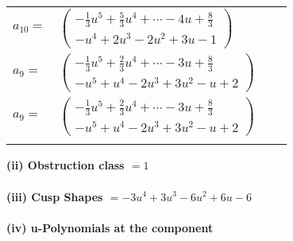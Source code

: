 \documentclass[1p]{elsarticle_modified}
\theoremstyle{definition}
\begin{document}
\begin{tabular}{m{7pt} m{180pt} m{7pt} m{180pt} }
\flushright $a_{10}=$&$\begin{pmatrix}-\frac{1}{3} u^5+\frac{5}{3} u^4+\cdots-4 u+\frac{8}{3}\\- u^4+2 u^3-2 u^2+3 u-1\end{pmatrix}$ \\
\flushright $a_{9}=$&$\begin{pmatrix}-\frac{1}{3} u^5+\frac{2}{3} u^4+\cdots-3 u+\frac{8}{3}\\- u^5+u^4-2 u^3+3 u^2- u+2\end{pmatrix}$\\ \flushright $a_{9}=$&$\begin{pmatrix}-\frac{1}{3} u^5+\frac{2}{3} u^4+\cdots-3 u+\frac{8}{3}\\- u^5+u^4-2 u^3+3 u^2- u+2\end{pmatrix}$\\&\end{tabular}
\flushleft \textbf{(ii) Obstruction class $= 1$}\\~\\
\flushleft \textbf{(iii) Cusp Shapes $= -3 u^4+3 u^3-6 u^2+6 u-6$}\\~\\
\newpage\renewcommand{\arraystretch}{1}
\flushleft \textbf{(iv) u-Polynomials at the component}\newline \\
\end{document}
